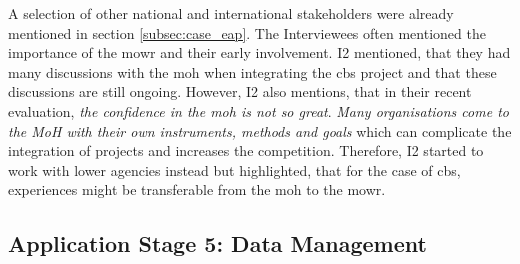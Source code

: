 A selection of other national and international stakeholders were already mentioned in section \ref{subsec:case_eap}. The Interviewees often mentioned the importance of the \acrshort{mowr} and their early involvement. I2 mentioned, that they had many discussions with the \acrshort{moh} when integrating the \acrshort{cbs} project and that these discussions are still ongoing. However, I2 also mentions, that in their recent evaluation, \textit{the confidence in the \acrshort{moh} is not so great}. \textit{Many organisations come to the MoH with their own instruments, methods and goals} which can complicate the integration of projects and increases the competition. Therefore, I2 started to work with lower agencies instead but highlighted, that for the case of \acrshort{cbs}, experiences might be transferable from the \acrshort{moh} to the \acrshort{mowr}. 


\subsection{Application Stage 5: Data Management}\label{subsec:stage5_appl}

